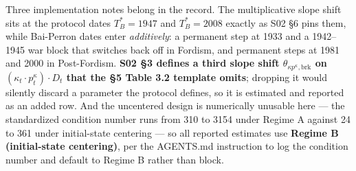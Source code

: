 \documentclass[11pt,a4paper]{article}
\begin{document}
Three implementation notes belong in the record. The multiplicative slope shift sits at the protocol dates $T_B^* = 1947$ and $T_B^* = 2008$ exactly as S02 \S6 pins them, while Bai-Perron dates enter \textit{additively}: a permanent step at 1933 and a 1942--1945 war block that switches back off in Fordism, and permanent steps at 1981 and 2000 in Post-Fordism. \textbf{S02 \S3 defines a third slope shift $\theta_{\kappa p^{\kappa}, \text{brk}}$ on $(\kappa_t \cdot p_t^{\kappa}) \cdot D_t$ that the \S5 Table 3.2 template omits}; dropping it would silently discard a parameter the protocol defines, so it is estimated and reported as an added row. And the uncentered design is numerically unusable here --- the standardized condition number runs from 310 to 3154 under Regime A against 24 to 361 under initial-state centering --- so all reported estimates use \textbf{Regime B (initial-state centering)}, per the AGENTS.md instruction to log the condition number and default to Regime B rather than block.
\end{document}
